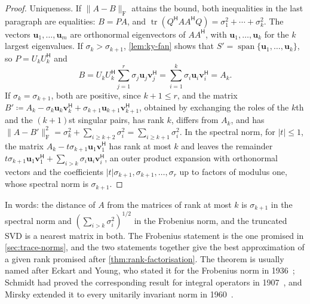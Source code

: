 \begin{proof}
Uniqueness. If $\|A-B\|_{\mathrm F}$ attains the bound, both inequalities in the last paragraph are equalities: $B=PA$, and $\operatorname{tr}(Q^{\mathsf H}AA^{\mathsf H}Q)=\sigma_1^2+\cdots+\sigma_k^2$. The vectors $\mathbf u_1,\ldots,\mathbf u_m$ are orthonormal eigenvectors of $AA^{\mathsf H}$, with $\mathbf u_1,\ldots,\mathbf u_k$ for the $k$ largest eigenvalues. If $\sigma_k>\sigma_{k+1}$, \cref{lem:ky-fan} shows that $S'=\operatorname{span}\{\mathbf u_1,\ldots,\mathbf u_k\}$, so $P=U_kU_k^{\mathsf H}$ and
\[
B=U_kU_k^{\mathsf H}\sum_{j=1}^r\sigma_j\mathbf u_j\mathbf v_j^{\mathsf H}=\sum_{i=1}^k\sigma_i\mathbf u_i\mathbf v_i^{\mathsf H}=A_k .
\]
If $\sigma_k=\sigma_{k+1}$, both are positive, since $k+1\le r$, and the matrix $B'\coloneqq A_k-\sigma_k\mathbf u_k\mathbf v_k^{\mathsf H}+\sigma_{k+1}\mathbf u_{k+1}\mathbf v_{k+1}^{\mathsf H}$, obtained by exchanging the roles of the $k$th and the $(k+1)$st singular pairs, has rank $k$, differs from $A_k$, and has $\|A-B'\|_{\mathrm F}^2=\sigma_k^2+\sum_{i\ge k+2}\sigma_i^2=\sum_{i\ge k+1}\sigma_i^2$. In the spectral norm, for $|t|\le1$, the matrix $A_k-t\sigma_{k+1}\mathbf u_1\mathbf v_1^{\mathsf H}$ has rank at most $k$ and leaves the remainder $t\sigma_{k+1}\mathbf u_1\mathbf v_1^{\mathsf H}+\sum_{i>k}\sigma_i\mathbf u_i\mathbf v_i^{\mathsf H}$, an outer product expansion with orthonormal vectors and the coefficients $|t|\sigma_{k+1},\sigma_{k+1},\ldots,\sigma_r$ up to factors of modulus one, whose spectral norm is $\sigma_{k+1}$.
\end{proof}

In words: the distance of $A$ from the matrices of rank at most $k$ is $\sigma_{k+1}$ in the spectral norm and $(\sum_{i>k}\sigma_i^2)^{1/2}$ in the Frobenius norm, and the truncated SVD is a nearest matrix in both. The Frobenius statement is the one promised in \cref{sec:trace-norms}, and the two statements together give the best approximation of a given rank promised after \cref{thm:rank-factorisation}. The theorem is usually named after Eckart and Young, who stated it for the Frobenius norm in 1936~\cite{eckart1936}; Schmidt had proved the corresponding result for integral operators in 1907~\cite{schmidt1907,stewart1993}, and Mirsky extended it to every unitarily invariant norm in 1960~\cite{mirsky1960}.

